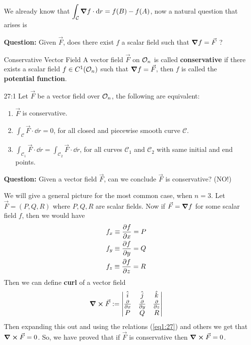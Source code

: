 \documentclass[../Analysis-3.tex]{subfiles}
\begin{document}
We already know that $\displaystyle\int_{\mathcal{C}} \grad f \cdot \dd r = f(B) - f(A)$, now a natural question that arises is

\textbf{Question:} Given $\vec{F}$, does there exist $f$ a scalar field such that $\grad f = \vec{F}$ ?

\begin{Def}{Conservative Vector Field}{}
  A vector field $\vec{F}$ on $\mathcal{O}_{n}$ is called \textbf{conservative} if there exists a scalar field $f \in C^1(\mathcal{O}_{n})$ such that $\grad f = \vec{F}$, then $f$ is called the \textbf{potential function}.
\end{Def}

\begin{Thm}{}{27:1}
  Let $\vec{F}$ be a vector field over $\mathcal{O}_{n}$, the following are equivalent:
  \begin{enumerate}
    \item $\vec{F}$ is conservative.
    \item $\displaystyle\int_{\mathcal{C}}\vec{F} \cdot \dd r = 0$, for all closed and piecewise smooth curve $\mathcal{C}$.
    \item $\displaystyle\int_{\mathcal{C}_1} \vec{F} \cdot \dd r = \int_{\mathcal{C}_2} \vec{F} \cdot \dd r$, for all curves $\mathcal{C}_1$ and $\mathcal{C}_2$ with same initial and end points.
  \end{enumerate}
\end{Thm}

\textbf{Question:} Given a vector field $\vec{F}$, can we conclude $\vec{F}$ is conservative? (NO!)

We will give a general picture for the most common case, when $n = 3$. Let $\vec{F} = (P,Q,R)$ where $P,Q,R$ are scalar fields. Now if $\vec{F} = \grad f$ for some scalar field $f$, then we would have
\begin{align}\label{eq1:27}
   & f_x \equiv \pdv{f}{x} = P \nonumber \\
   & f_y \equiv \pdv{f}{y} = Q           \\
   & f_z \equiv \pdv{f}{z} = R \nonumber
\end{align}
Then we can define \textbf{curl} of a vector field
\[
  \curl \vec{F} := \begin{vmatrix}
    \hat{i}   & \hat{j}   & \hat{k}   \\
    \pdv{}{x} & \pdv{}{y} & \pdv{}{z} \\
    P         & Q         & R
  \end{vmatrix}
\]
Then expanding this out and using the relations (\ref{eq1:27}) and others we get that $\curl \vec{F} = 0$. So, we have proved that if $\vec{F}$ is conservative then $\curl \vec{F} = 0$.
\end{document}
